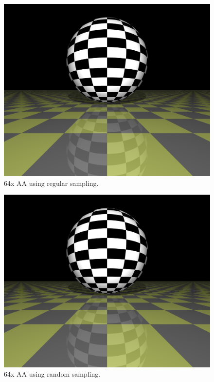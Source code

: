 \documentclass{article}
\begin{document}
\begin{figure}[H]
    \includegraphics[width=\textwidth]{./examples/AntiAliasingComparison/Scene_regular64.png}
    \caption{64x AA using regular sampling.}
\end{figure}

\begin{figure}[H]
    \includegraphics[width=\textwidth]{./examples/AntiAliasingComparison/Scene_random64.png}
    \caption{64x AA using random sampling.}
\end{figure}
\end{document}
